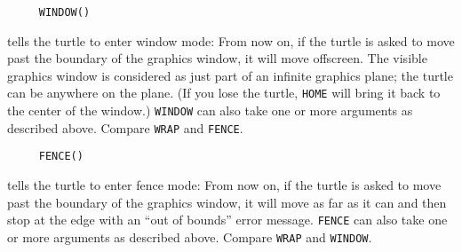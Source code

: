 \begin{verbatim}
     WINDOW()
\end{verbatim}
tells the turtle to enter window mode: From now on, if the turtle is
asked to move past the boundary of the graphics window, it will move
offscreen.  The visible graphics window is considered as just part of
an infinite graphics plane; the turtle can be anywhere on the plane.
(If you lose the turtle, \texttt{HOME} will bring it back to the
center of the window.)  \texttt{WINDOW} can also take one or more
arguments as described above.  Compare \texttt{WRAP} and
\texttt{FENCE}.

\begin{verbatim}
     FENCE()
\end{verbatim}
tells the turtle to enter fence mode: From now on, if the turtle is
asked to move past the boundary of the graphics window, it will move
as far as it can and then stop at the edge with an ``out of bounds''
error message.  \texttt{FENCE} can also take one or more arguments as
described above.  Compare \texttt{WRAP} and \texttt{WINDOW}.






